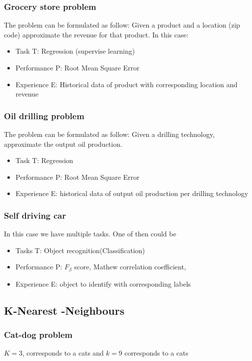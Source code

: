 \documentclass[11pt, oneside]{article}   	%
\begin{document}
\subsubsection{Grocery store problem}
The problem can be formulated as follow: Given a product and a location (zip code) approximate the revenue for that product. In this case:
\begin{itemize}
\item Task T: Regression (supervise learning)
\item Performance P: Root Mean Square Error
\item Experience E: Historical data of product with corresponding location and revenue
\end{itemize}


\subsubsection{Oil drilling problem}
The problem can be formulated as follow: Given a drilling technology, approximate the output oil production.
\begin{itemize}
\item Task T: Regression
\item Performance P: Root Mean Square Error
\item Experience E: historical data of output oil production per drilling technology 
\end{itemize}


\subsubsection{Self driving car}
In this case we have multiple tasks. One of then could be 
\begin{itemize}
\item Tasks T: Object recognition(Classification)
\item Performance P: $F_{\beta}$ score, Mathew correlation coefficient, 
\item Experience E: object to identify with corresponding labels 
\end{itemize}


\subsection{K-Nearest -Neighbours}
\subsubsection{Cat-dog problem}
$K = 3$, corresponds to a cats and $k=9$ corresponds to a cats
\end{document}
